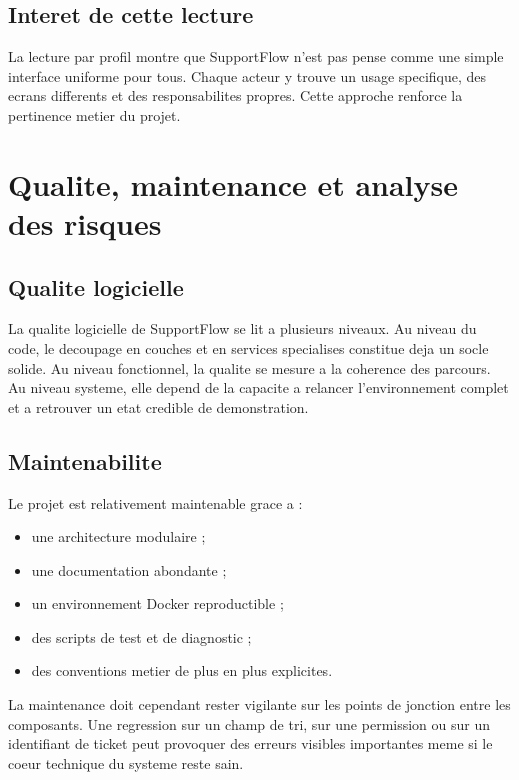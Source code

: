 \documentclass[12pt,a4paper,oneside]{report}
\begin{document}
\section{Interet de cette lecture}

La lecture par profil montre que SupportFlow n'est pas pense comme une simple interface uniforme pour tous. Chaque acteur y trouve un usage specifique, des ecrans differents et des responsabilites propres. Cette approche renforce la pertinence metier du projet.

\chapter{Qualite, maintenance et analyse des risques}

\section{Qualite logicielle}

La qualite logicielle de SupportFlow se lit a plusieurs niveaux. Au niveau du code, le decoupage en couches et en services specialises constitue deja un socle solide. Au niveau fonctionnel, la qualite se mesure a la coherence des parcours. Au niveau systeme, elle depend de la capacite a relancer l'environnement complet et a retrouver un etat credible de demonstration.

\section{Maintenabilite}

Le projet est relativement maintenable grace a :

\begin{itemize}[leftmargin=1.2cm]
  \item une architecture modulaire ;
  \item une documentation abondante ;
  \item un environnement Docker reproductible ;
  \item des scripts de test et de diagnostic ;
  \item des conventions metier de plus en plus explicites.
\end{itemize}

La maintenance doit cependant rester vigilante sur les points de jonction entre les composants. Une regression sur un champ de tri, sur une permission ou sur un identifiant de ticket peut provoquer des erreurs visibles importantes meme si le coeur technique du systeme reste sain.
\end{document}
